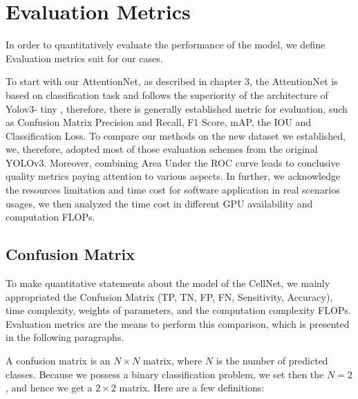 \section{Evaluation Metrics}
\label{sec:lorem}
In order to quantitatively evaluate the performance of the model, we define Evaluation metrics suit for our cases.

To start with our AttentionNet,  as described in chapter 3, the AttentionNet is based on classification task and follows the superiority of the architecture of Yolov3- tiny \cite{18}, therefore, there is generally established metric for evaluation, such as Confusion Matrix Precision and Recall, F1 Score, mAP,  the IOU and  Classification Loss. To compare our methods on the new dataset we established, we, therefore, adopted most of those evaluation schemes from the original YOLOv3\cite{33}. Moreover, combining Area Under the ROC curve leads to conclusive quality metrics paying attention to various aspects. 
In further, we acknowledge the resources limitation and time cost for software application in real scenarios usages, we then analyzed the time cost in different GPU availability and computation FLOPs.


\subsection{Confusion Matrix}
To make quantitative statements about the model of the CellNet, we mainly appropriated the  Confusion Matrix (TP, TN, FP, FN, Sensitivity, Accuracy), time complexity, weights of parameters, and the computation complexity FLOPs. 
Evaluation metrics are the means to perform this comparison, which is presented in the following paragraphs.

A confusion matrix is an $N \times N $ matrix, where $ N $ is the number of predicted classes. Because we possess a binary classification problem, we set then the $N=2$, and hence we get a $2 \times 2$ matrix. Here are a few definitions:


